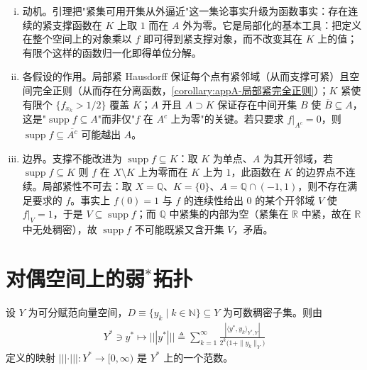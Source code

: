 \documentclass[../main.tex]{subfiles}
\begin{document}
\begin{remark}\label{remark:appA-光滑截断}
\begin{enumerate}[(i)]
\item 动机。引理把"紧集可用开集从外逼近"这一集论事实升级为函数事实：存在连续的紧支撑函数在 $K$ 上取 $1$ 而在 $A$ 外为零。它是局部化的基本工具：把定义在整个空间上的对象乘以 $f$ 即可得到紧支撑对象，而不改变其在 $K$ 上的值；有限个这样的函数归一化即得单位分解。
\item 各假设的作用。局部紧 Hausdorff 保证每个点有紧邻域（从而支撑可紧）且空间完全正则（从而存在分离函数，\cref{corollary:appA-局部紧完全正则}）；$K$ 紧使有限个 $\{f_{x_k}>1/2\}$ 覆盖 $K$；$A$ 开且 $A\supset K$ 保证存在中间开集 $B$ 使 $\overline B\subseteq A$，这是"$\operatorname{supp}f\subseteq A$"而非仅"$f$ 在 $A^c$ 上为零"的关键。若只要求 $f|_{A^c}=0$，则 $\operatorname{supp}f\subseteq\overline{A^c}$ 可能越出 $A$。
\item 边界。支撑不能改进为 $\operatorname{supp}f\subseteq K$：取 $K$ 为单点、$A$ 为其开邻域，若 $\operatorname{supp}f\subseteq K$ 则 $f$ 在 $X\setminus K$ 上为零而在 $K$ 上为 $1$，此函数在 $K$ 的边界点不连续。局部紧性不可去：取 $X=\mathbb{Q}$、$K=\{0\}$、$A=\mathbb{Q}\cap(-1,1)$，则不存在满足要求的 $f$。事实上 $f(0)=1$ 与 $f$ 的连续性给出 $0$ 的某个开邻域 $V$ 使 $f|_V=1$，于是 $V\subseteq\operatorname{supp}f$；而 $\mathbb{Q}$ 中紧集的内部为空（紧集在 $\mathbb{R}$ 中紧，故在 $\mathbb{R}$ 中无处稠密），故 $\operatorname{supp}f$ 不可能既紧又含开集 $V$，矛盾。
\end{enumerate}
\end{remark}

\section{对偶空间上的弱$^*$拓扑}\label{section:appA-对偶弱星}

\begin{lemma}\label{lemma:appA-Ystar范数}
设 $Y$ 为可分赋范向量空间，$D\equiv\{y_k\mid k\in\mathbb{N}\}\subseteq Y$ 为可数稠密子集。则由
\begin{align}
Y^*\ni y^*\mapsto|||y^*|||\triangleq\sum_{k=1}^\infty\frac{|\langle y^*,y_k\rangle_{Y^*,Y}|}{2^k\bigl(1+\|y_k\|_Y\bigr)} \label{align:appA-Ystar范数}
\end{align}
定义的映射 $|||\cdot|||:Y^*\to[0,\infty)$ 是 $Y^*$ 上的一个范数。
\end{lemma}
\end{document}
